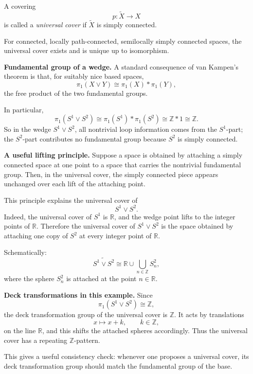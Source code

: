 \documentclass[12pt,a4paper]{article}
\theoremstyle{notespace}
\begin{document}
A covering
\[
p:\widetilde X\to X
\]
is called a \emph{universal cover} if \(\widetilde X\) is simply connected.

For connected, locally path-connected, semilocally simply connected spaces, the universal cover exists and is unique up to isomorphism.

\medskip

\textbf{Fundamental group of a wedge.}
A standard consequence of van Kampen's theorem is that, for suitably nice based spaces,
\[
\pi_1(X\vee Y)\cong \pi_1(X)*\pi_1(Y),
\]
the free product of the two fundamental groups.

In particular,
\[
\pi_1(S^1\vee S^2)\cong \pi_1(S^1)*\pi_1(S^2)\cong \mathbb Z * 1 \cong \mathbb Z.
\]
So in the wedge \(S^1\vee S^2\), all nontrivial loop information comes from the \(S^1\)-part; the \(S^2\)-part contributes no fundamental group because \(S^2\) is simply connected.

\medskip

\textbf{A useful lifting principle.}
Suppose a space is obtained by attaching a simply connected space at one point to a space that carries the nontrivial fundamental group. Then, in the universal cover, the simply connected piece appears unchanged over each lift of the attaching point.

This principle explains the universal cover of
\[
S^1\vee S^2.
\]
Indeed, the universal cover of \(S^1\) is \(\mathbb R\), and the wedge point lifts to the integer points of \(\mathbb R\). Therefore the universal cover of \(S^1\vee S^2\) is the space obtained by attaching one copy of \(S^2\) at every integer point of \(\mathbb R\).

Schematically:
\[
\widetilde{S^1\vee S^2}
\cong
\mathbb R \cup \bigcup_{n\in\mathbb Z} S^2_n,
\]
where the sphere \(S^2_n\) is attached at the point \(n\in \mathbb R\).

\medskip

\textbf{Deck transformations in this example.}
Since
\[
\pi_1(S^1\vee S^2)\cong \mathbb Z,
\]
the deck transformation group of the universal cover is \(\mathbb Z\). It acts by translations
\[
x\longmapsto x+k,\qquad k\in \mathbb Z,
\]
on the line \(\mathbb R\), and this shifts the attached spheres accordingly. Thus the universal cover has a repeating \(\mathbb Z\)-pattern.

This gives a useful consistency check: whenever one proposes a universal cover, its deck transformation group should match the fundamental group of the base.

\bigskip
\end{document}
